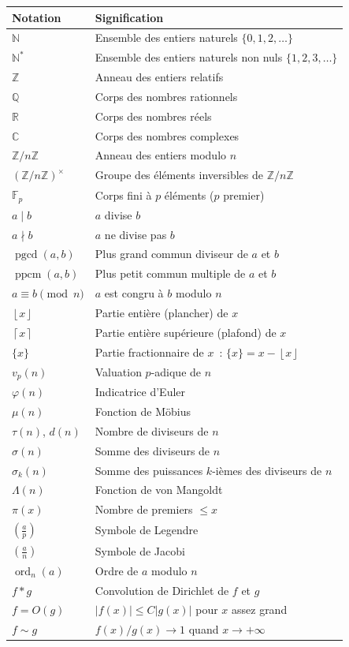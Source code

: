 \documentclass[12pt,a4paper,openany]{book}
\theoremstyle{definition}
\theoremstyle{plain}
\theoremstyle{remark}
\newcommand{\N}{\mathbb{N}}
\newcommand{\Z}{\mathbb{Z}}
\newcommand{\Q}{\mathbb{Q}}
\newcommand{\R}{\mathbb{R}}
\newcommand{\C}{\mathbb{C}}
\newcommand{\F}{\mathbb{F}}
\newcommand{\abs}[1]{\left|#1\right|}
\newcommand{\floor}[1]{\left\lfloor #1 \right\rfloor}
\newcommand{\ceil}[1]{\left\lceil #1 \right\rceil}
\newcommand{\legendre}[2]{\left(\frac{#1}{#2}\right)}
\newcommand{\jacobi}[2]{\left(\frac{#1}{#2}\right)}
\DeclareMathOperator{\pgcd}{pgcd}
\DeclareMathOperator{\ppcm}{ppcm}
\DeclareMathOperator{\ord}{ord}
\begin{document}
\begin{center}
\renewcommand{\arraystretch}{1.4}
\begin{tabular}{>{\raggedright}p{3.5cm} p{9cm}}
\toprule
\textbf{Notation} & \textbf{Signification} \\
\midrule
$\N$ & Ensemble des entiers naturels $\{0, 1, 2, \ldots\}$ \\
$\N^*$ & Ensemble des entiers naturels non nuls $\{1, 2, 3, \ldots\}$ \\
$\Z$ & Anneau des entiers relatifs \\
$\Q$ & Corps des nombres rationnels \\
$\R$ & Corps des nombres réels \\
$\C$ & Corps des nombres complexes \\
$\Z/n\Z$ & Anneau des entiers modulo $n$ \\
$(\Z/n\Z)^\times$ & Groupe des éléments inversibles de $\Z/n\Z$ \\
$\F_p$ & Corps fini à $p$ éléments ($p$ premier) \\
$a \mid b$ & $a$ divise $b$ \\
$a \nmid b$ & $a$ ne divise pas $b$ \\
$\pgcd(a,b)$ & Plus grand commun diviseur de $a$ et $b$ \\
$\ppcm(a,b)$ & Plus petit commun multiple de $a$ et $b$ \\
$a \equiv b \pmod{n}$ & $a$ est congru à $b$ modulo $n$ \\
$\floor{x}$ & Partie entière (plancher) de $x$ \\
$\ceil{x}$ & Partie entière supérieure (plafond) de $x$ \\
$\{x\}$ & Partie fractionnaire de $x$~: $\{x\} = x - \floor{x}$ \\
$v_p(n)$ & Valuation $p$-adique de $n$ \\
$\varphi(n)$ & Indicatrice d'Euler\index{indicatrice d'Euler} \\
$\mu(n)$ & Fonction de Möbius\index{fonction de Möbius} \\
$\tau(n)$, $d(n)$ & Nombre de diviseurs de $n$ \\
$\sigma(n)$ & Somme des diviseurs de $n$ \\
$\sigma_k(n)$ & Somme des puissances $k$-ièmes des diviseurs de $n$ \\
$\Lambda(n)$ & Fonction de von Mangoldt\index{fonction de von Mangoldt} \\
$\pi(x)$ & Nombre de premiers $\leq x$ \\
$\legendre{a}{p}$ & Symbole de Legendre\index{symbole de Legendre} \\
$\jacobi{a}{n}$ & Symbole de Jacobi\index{symbole de Jacobi} \\
$\ord_n(a)$ & Ordre de $a$ modulo $n$ \\
$f \ast g$ & Convolution de Dirichlet\index{convolution de Dirichlet} de $f$ et $g$ \\
$f = O(g)$ & $\abs{f(x)} \leq C\abs{g(x)}$ pour $x$ assez grand \\
$f \sim g$ & $f(x)/g(x) \to 1$ quand $x \to +\infty$ \\
\bottomrule
\end{tabular}
\end{center}
\end{document}
